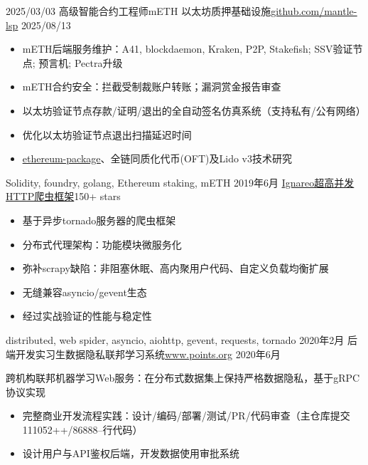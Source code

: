 \begin{experiences}
 \experience
    {2025/03/03}     {高级智能合约工程师}{mETH 以太坊质押基础设施}{\href{https://github.com/mantle-lsp}{\underline{github.com/mantle-lsp}}}
    {2025/08/13}    {
        \begin{itemize}
            \item mETH后端服务维护：A41, blockdaemon, Kraken, P2P, Stakefish; SSV验证节点; 预言机; Pectra升级
            \item mETH合约安全：拦截受制裁账户转账；漏洞赏金报告审查
            \item 以太坊验证节点存款/证明/退出的全自动签名仿真系统（支持私有/公有网络）
            \item 优化以太坊验证节点退出扫描延迟时间
            \item \href{https://github.com/ethpandaops/ethereum-package}{\underline{ethereum-package}}、全链同质化代币(OFT)及Lido v3技术研究
        \end{itemize}
                    }
                    {Solidity, foundry, golang, Ethereum staking, mETH}
  \emptySeparator
  \experience
    {2019年6月} {\href{https://github.com/Hecate2/Ignareo-ISML-auto-voter}{\underline{Ignareo}}}{\href{https://github.com/Hecate2/Ignareo-ISML-auto-voter}{超高并发HTTP爬虫框架}}{150+ stars}
    {}    {
                      \begin{itemize}
                        \item 基于异步tornado服务器的爬虫框架
                        \item 分布式代理架构：功能模块微服务化
                        \item 弥补scrapy缺陷：非阻塞休眠、高内聚用户代码、自定义负载均衡扩展
                        \item 无缝兼容asyncio/gevent生态
                        \item 经过实战验证的性能与稳定性
                      \end{itemize}
                    }
                    {distributed, web spider, asyncio, aiohttp, gevent, requests, tornado}
  \emptySeparator
   \experience
    {2020年2月} {后端开发实习生}{数据隐私联邦学习系统}{\href{https://www.points.org}{\underline{www.points.org}}}
    {2020年6月}    {
    跨机构联邦机器学习Web服务：在分布式数据集上保持严格数据隐私，基于gRPC协议实现
                      \begin{itemize}
                        \item 完整商业开发流程实践：设计/编码/部署/测试/PR/代码审查（主仓库提交111052++/86888--行代码）
                        \item 设计用户与API鉴权后端，开发数据使用审批系统

\end{itemize}}
\end{experiences}
